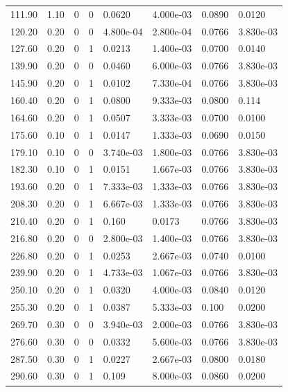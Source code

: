 \documentclass[preview]{standalone}
\begin{document}
{{\begin{tabular}{L{1.2cm}C{1.2cm} C{0.3cm}C{0.5cm} C{1.4cm}C{1.4cm} C{1.4cm}C{1.4cm}}
  111.90  &  1.10  & 0     &  0 &  0.0620  & 4.000e-03  & 0.0890 &  0.0120   \\ 
  120.20  &  0.20  & 0     &  0 &  4.800e-04  & 2.800e-04  & 0.0766 &  3.830e-03   \\ 
  127.60  &  0.20  & 0     &  1 &  0.0213  & 1.400e-03  & 0.0700 &  0.0140   \\ 
  139.90  &  0.20  & 0     &  0 &  0.0460  & 6.000e-03  & 0.0766 &  3.830e-03   \\ 
  145.90  &  0.20  & 0     &  1 &  0.0102  & 7.330e-04  & 0.0766 &  3.830e-03   \\ 
  160.40  &  0.20  & 0     &  1 &  0.0800  & 9.333e-03  & 0.0800 &  0.114   \\ 
  164.60  &  0.20  & 0     &  1 &  0.0507  & 3.333e-03  & 0.0700 &  0.0100   \\ 
  175.60  &  0.10  & 0     &  1 &  0.0147  & 1.333e-03  & 0.0690 &  0.0150   \\ 
  179.10  &  0.10  & 0     &  0 &  3.740e-03  & 1.800e-03  & 0.0766 &  3.830e-03   \\ 
  182.30  &  0.10  & 0     &  1 &  0.0151  & 1.667e-03  & 0.0766 &  3.830e-03   \\ 
  193.60  &  0.20  & 0     &  1 &  7.333e-03  & 1.333e-03  & 0.0766 &  3.830e-03   \\ 
  208.30  &  0.20  & 0     &  1 &  6.667e-03  & 1.333e-03  & 0.0766 &  3.830e-03   \\ 
  210.40  &  0.20  & 0     &  1 &  0.160  & 0.0173  & 0.0766 &  3.830e-03   \\ 
  216.80  &  0.20  & 0     &  0 &  2.800e-03  & 1.400e-03  & 0.0766 &  3.830e-03   \\ 
  226.80  &  0.20  & 0     &  1 &  0.0253  & 2.667e-03  & 0.0740 &  0.0100   \\ 
  239.90  &  0.20  & 0     &  1 &  4.733e-03  & 1.067e-03  & 0.0766 &  3.830e-03   \\ 
  250.10  &  0.20  & 0     &  1 &  0.0320  & 4.000e-03  & 0.0840 &  0.0120   \\ 
  255.30  &  0.20  & 0     &  1 &  0.0387  & 5.333e-03  & 0.100 &  0.0200   \\ 
  269.70  &  0.30  & 0     &  0 &  3.940e-03  & 2.000e-03  & 0.0766 &  3.830e-03   \\ 
  276.60  &  0.30  & 0     &  0 &  0.0332  & 5.600e-03  & 0.0766 &  3.830e-03   \\ 
  287.50  &  0.30  & 0     &  1 &  0.0227  & 2.667e-03  & 0.0800 &  0.0180   \\ 
  290.60  &  0.30  & 0     &  1 &  0.109  & 8.000e-03  & 0.0860 &  0.0200   \\ 

\end{tabular}}}
\end{document}
